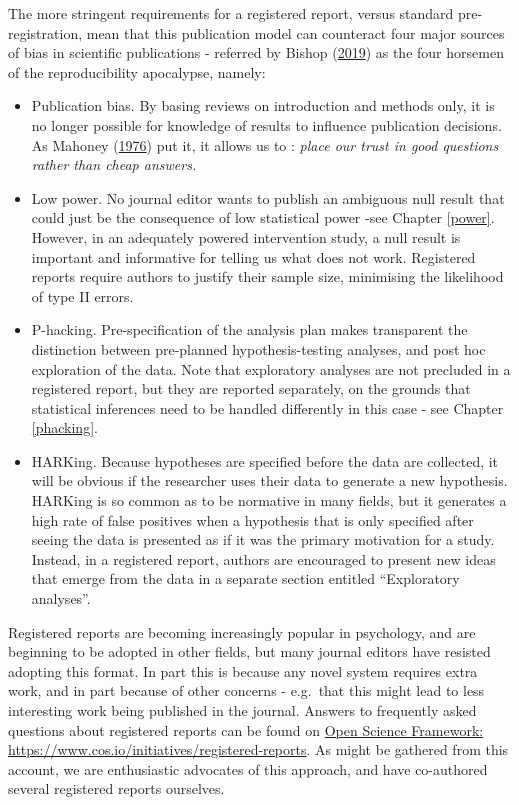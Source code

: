\documentclass{krantz}
\begin{document}
The more stringent requirements for a registered report, versus standard pre-registration, mean that this publication model can counteract four major sources of bias in scientific publications - referred by Bishop (\protect\hyperlink{ref-bishop2019}{2019}) as the four horsemen of the reproducibility apocalypse, namely:

\begin{itemize}
\item
  Publication bias. By basing reviews on introduction and methods only, it is no longer possible for knowledge of results to influence publication decisions. As Mahoney (\protect\hyperlink{ref-mahoney1976}{1976}) put it, it allows us to : \emph{place our trust in good questions rather than cheap answers.}
\item
  Low power. No journal editor wants to publish an ambiguous null result that could just be the consequence of low statistical power -see Chapter \ref{power}. However, in an adequately powered intervention study, a null result is important and informative for telling us what does not work. Registered reports require authors to justify their sample size, minimising the likelihood of type II errors.
\item
  P-hacking. Pre-specification of the analysis plan makes transparent the distinction between pre-planned hypothesis-testing analyses, and post hoc exploration of the data. Note that exploratory analyses are not precluded in a registered report, but they are reported separately, on the grounds that statistical inferences need to be handled differently in this case - see Chapter \ref{phacking}.
\item
  HARKing. Because hypotheses are specified before the data are collected, it will be obvious if the researcher uses their data to generate a new hypothesis. HARKing is so common as to be normative in many fields, but it generates a high rate of false positives when a hypothesis that is only specified after seeing the data is presented as if it was the primary motivation for a study. Instead, in a registered report, authors are encouraged to present new ideas that emerge from the data in a separate section entitled ``Exploratory analyses''.
\end{itemize}

Registered reports are becoming increasingly popular in psychology, and are beginning to be adopted in other fields, but many journal editors have resisted adopting this format. In part this is because any novel system requires extra work, and in part because of other concerns - e.g.~that this might lead to less interesting work being published in the journal. Answers to frequently asked questions about registered reports can be found on \href{https://www.cos.io/initiatives/registered-reports}{Open Science Framework: https://www.cos.io/initiatives/registered-reports}. As might be gathered from this account, we are enthusiastic advocates of this approach, and have co-authored several registered reports ourselves.
\end{document}
